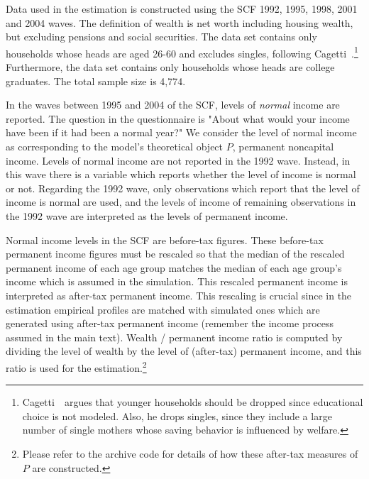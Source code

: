 \documentclass[titlepage, headings=optiontotocandhead]{\econtex}
\begin{document}
Data used in the estimation is constructed using the SCF 1992, 1995, 1998, 2001 and 2004 waves. The definition of wealth is net worth including housing wealth, but excluding pensions and social securities. The data set contains only households whose heads are aged 26-60 and excludes singles, following Cagetti~\citeyearpar{cagettiWprofiles}.\footnote{Cagetti~\citeyearpar{cagettiWprofiles}\ argues that younger households should be dropped since educational choice is not modeled. Also, he drops singles, since they include a large number of single mothers whose saving behavior is influenced by welfare.} Furthermore, the data set contains only households whose heads are college graduates. The total sample size is 4,774.

In the waves between 1995 and 2004 of the SCF, levels of
\textit{normal} income are reported. The question in the questionnaire
is "About what would your income have been if it had been a normal
year?" We consider the level of normal income as corresponding to the
model's theoretical object $P$, permanent noncapital income. Levels of
normal income are not reported in the 1992 wave. Instead, in this wave
there is a variable which reports whether the level of income is
normal or not. Regarding the 1992 wave, only observations which report
that the level of income is normal are used, and the levels of income
of remaining observations in the 1992 wave are interpreted as the
levels of permanent income.

Normal income levels in the SCF are before-tax figures. These
before-tax permanent income figures must be rescaled so that the median of
the rescaled permanent income of each age group matches the median of
each age group's income which is assumed in the simulation. This
rescaled permanent income is interpreted as after-tax permanent
income. This rescaling is crucial since in the estimation empirical
profiles are matched with simulated ones which are generated using
after-tax permanent income (remember the income process assumed in the
main text). Wealth / permanent income ratio is computed by dividing
the level of wealth by the level of (after-tax) permanent income, and
this ratio is used for the estimation.\footnote{Please refer to the archive code for details of
  how these after-tax measures of $P$ are constructed.}

\vfill\clearpage


\end{document}
